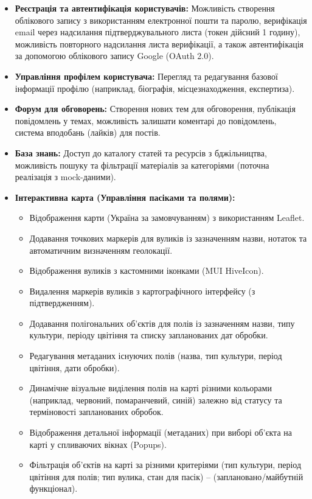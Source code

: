 \begin{itemize}
    \item \textbf{Реєстрація та автентифікація користувачів:} Можливість створення облікового запису з використанням електронної пошти та паролю, верифікація email через надсилання підтверджувального листа (токен дійсний 1 годину), можливість повторного надсилання листа верифікації, а також автентифікація за допомогою облікового запису Google (OAuth 2.0).
    \item \textbf{Управління профілем користувача:} Перегляд та редагування базової інформації профілю (наприклад, біографія, місцезнаходження, експертиза).
    \item \textbf{Форум для обговорень:} Створення нових тем для обговорення, публікація повідомлень у темах, можливість залишати коментарі до повідомлень, система вподобань (лайків) для постів.
    \item \textbf{База знань:} Доступ до каталогу статей та ресурсів з бджільництва, можливість пошуку та фільтрації матеріалів за категоріями (поточна реалізація з mock-даними).
    \item \textbf{Інтерактивна карта (Управління пасіками та полями):} 
        \begin{itemize}
            \item Відображення карти (Україна за замовчуванням) з використанням Leaflet.
            \item Додавання точкових маркерів для вуликів із зазначенням назви, нотаток та автоматичним визначенням геолокації.
            \item Відображення вуликів з кастомними іконками (MUI HiveIcon).
            \item Видалення маркерів вуликів з картографічного інтерфейсу (з підтвердженням).
            \item Додавання полігональних об'єктів для полів із зазначенням назви, типу культури, періоду цвітіння та списку запланованих дат обробки.
            \item Редагування метаданих існуючих полів (назва, тип культури, період цвітіння, дати обробки).
            \item Динамічне візуальне виділення полів на карті різними кольорами (наприклад, червоний, помаранчевий, синій) залежно від статусу та терміновості запланованих обробок.
            \item Відображення детальної інформації (метаданих) при виборі об'єкта на карті у спливаючих вікнах (Popups).
            \item Фільтрація об'єктів на карті за різними критеріями (тип культури, період цвітіння для полів; тип вулика, стан для пасік) -- (заплановано/майбутній функціонал).

\end{itemize}
\end{itemize}
